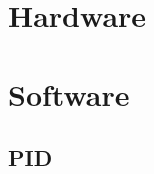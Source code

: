 
\section{Hardware}
\label{sec:hardware}

\section{Software}
\label{sec:software}

\subsection{PID}
\label{subsec:pid}

